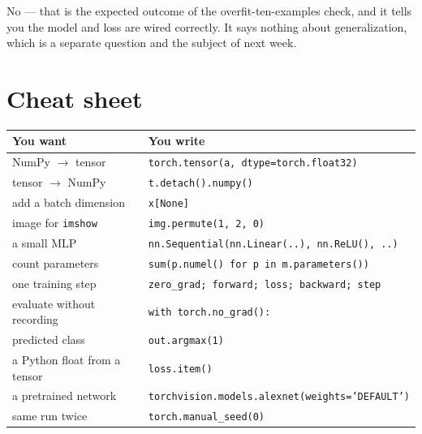 \documentclass[11pt]{article}
\begin{document}
 No --- that is the expected outcome of the overfit-ten-examples check,
and it tells you the model and loss are wired correctly. It says nothing about
generalization, which is a separate question and the subject of next week.

\section*{Cheat sheet}

\begin{center}
\begin{tabular}{@{}p{}p{}@{}}
\toprule
\textbf{You want} & \textbf{You write} \\
\midrule
NumPy $\rightarrow$ tensor             & \texttt{torch.tensor(a, dtype=torch.float32)} \\
tensor $\rightarrow$ NumPy             & \texttt{t.detach().numpy()} \\
add a batch dimension                  & \texttt{x[None]} \\
image for \texttt{imshow}              & \texttt{img.permute(1, 2, 0)} \\
a small MLP                            & \texttt{nn.Sequential(nn.Linear(..), nn.ReLU(), ..)} \\
count parameters                       & \texttt{sum(p.numel() for p in m.parameters())} \\
one training step                      & \texttt{zero\_grad; forward; loss; backward; step} \\
evaluate without recording             & \texttt{with torch.no\_grad():} \\
predicted class                        & \texttt{out.argmax(1)} \\
a Python float from a tensor           & \texttt{loss.item()} \\
a pretrained network                   & \texttt{torchvision.models.alexnet(weights='DEFAULT')} \\
same run twice                         & \texttt{torch.manual\_seed(0)} \\
\bottomrule
\end{tabular}
\end{center}
\end{document}
